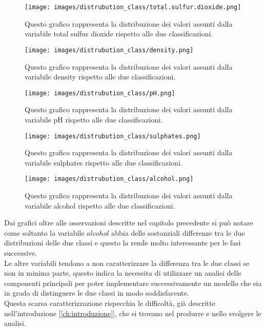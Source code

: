 \begin{figure}[H]
    \centering
    \texttt{[image: images/distrubution\_class/total.sulfur.dioxide.png]}
    \caption{Questo grafico rappresenta la distribuzione dei valori assunti dalla variabile total sulfur dioxide rispetto alle due classificazioni.}
    \label{fig:distrubution_class_total.sulfur.dioxide}
\end{figure}

\begin{figure}[H]
    \centering
    \texttt{[image: images/distrubution\_class/density.png]}
    \caption{Questo grafico rappresenta la distribuzione dei valori assunti dalla variabile density rispetto alle due classificazioni.}
    \label{fig:distrubution_class_density}
\end{figure}

\begin{figure}[H]
    \centering
    \texttt{[image: images/distrubution\_class/pH.png]}
    \caption{Questo grafico rappresenta la distribuzione dei valori assunti dalla variabile pH rispetto alle due classificazioni.}
    \label{fig:distrubution_class_pH}
\end{figure}

\begin{figure}[H]
    \centering
    \texttt{[image: images/distrubution\_class/sulphates.png]}
    \caption{Questo grafico rappresenta la distribuzione dei valori assunti dalla variabile sulphates rispetto alle due classificazioni.}
    \label{fig:distrubution_class_sulphates}
\end{figure}

\begin{figure}[H]
    \centering
    \texttt{[image: images/distrubution\_class/alcohol.png]}
    \caption{Questo grafico rappresenta la distribuzione dei valori assunti dalla variabile alcohol rispetto alle due classificazioni.}
    \label{fig:distrubution_class_alcohol}
\end{figure}

Dai grafici oltre alle osservazioni descritte nel capitolo precedente si può notare come soltanto la variabile $alcohol$ abbia delle sostanziali differenze tra le due distribuzioni delle due classi e questo la rende molto interessante per le fasi successive.\\
Le altre variabili tendono a non caratterizzare la differenza tra le due classi se non in minima parte, questo indica la necessita di utilizzare un analisi delle componenti principali per poter implementare successivamente un modello che sia in grado di distinguere le due classi in modo soddisfacente.\\
Questa scarsa caratterizzazione rispecchia le difficoltà, già descritte nell'introduzione [\ref{ch:introduzione}], che si trovano nel produrre e nello svolgere le analisi.
